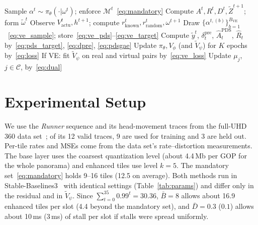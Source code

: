\documentclass[conference]{IEEEtran}
\newcommand{\Cset}{\mathcal{C}}
\newcommand{\om}{\omega}
\newcommand{\omt}{\widetilde{\omega}}
\newcommand{\Vt}{\widetilde{V}}
\newcommand{\Zt}{\widetilde{Z}}
\newcommand{\rk}{r_{\mathrm{known}}}
\newcommand{\rr}{r_{\mathrm{random}}}
\newcommand{\Vact}{V_{\mathrm{actu}}}
\newcommand{\BVE}{B_{\mathrm{VE}}}
\begin{document}
\begin{algorithm}[t]
\caption{Lagrangian PPO with PDS-GAE and optional VE}
\label{alg:ppo_pds}
\begin{algorithmic}[1]
    \STATE Sample $\alpha^t\sim\pi_\theta(\cdot|\om^t)$; enforce $\mathcal{M}^t$~\eqref{eq:mandatory}
    \STATE Compute $A^t,R^t,D^t,\Zt^{t+1}$; form $\omt^t$ 
    \STATE Observe $\Vact^t,h^{t+1}$; compute $\rk^t,\rr^t,\om^{t+1}$
      \STATE Draw $\{\alpha^{t,(b)}\}_{b=1}^{\BVE}$~\eqref{eq:ve_sample}; store~\eqref{eq:ve_pds}--\eqref{eq:ve_target}
    \ENDIF
  \ENDFOR
  \STATE Compute $\widetilde y^t$, $\delta_t^{\mathrm{pre}}$, $\widehat A_t^{\mathrm{PDS}}$, $\widehat R_t$ by~\eqref{eq:pds_target}, \eqref{eq:dpre}, \eqref{eq:pdsgae}
  \STATE Update $\pi_\theta,V_\phi$ (and $\Vt_\psi$) for $K$ epochs by~\eqref{eq:loss}
  \STATE If VE: fit $\Vt_\psi$ on real and virtual pairs by~\eqref{eq:ve_loss}
  \STATE Update $\mu_j$, $j\in\Cset$, by~\eqref{eq:dual}
\ENDFOR
\end{algorithmic}
\end{algorithm}

\section{Experimental Setup}
\label{sec:setup}

We use the \emph{Runner} sequence and its head-movement traces from the full-UHD 360\textdegree{} data set~\cite{chakareski2021dataset}; of its 12 valid traces, 9 are used for training and 3 are held out. Per-tile rates and MSEs come from the data set's rate--distortion measurements. The base layer uses the coarsest quantization level (about 4.4\,Mb per GOP for the whole panorama) and enhanced tiles use level $k=5$. The mandatory set~\eqref{eq:mandatory} holds 9--16 tiles (12.5 on average). Both methods run in Stable-Baselines3~\cite{raffin2021sb3} with identical settings (Table~\ref{tab:params}) and differ only in the residual and in $\Vt_\psi$. Since $\sum_{t=0}^{35}0.99^t=30.36$, $\bar B=8$ allows about 16.9 enhanced tiles per slot (4.4 beyond the mandatory set), and $\bar D=0.3$ ($0.1$) allows about 10\,ms (3\,ms) of stall per slot if stalls were spread uniformly.
\end{document}
